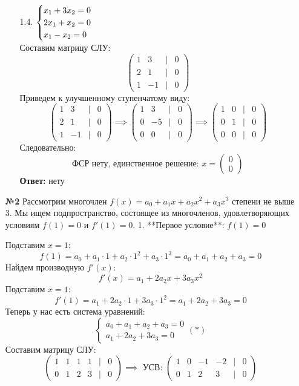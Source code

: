 \documentclass[a4paper]{article}
\newcommand{\mat}[1]{\begin{pmatrix} #1 \end{pmatrix}}
\newcommand{\case}[1]{\begin{cases} #1 \end{cases}}
\begin{document}
\begin{enumerate}
\begin{enumerate}
        \item[1.4.]$
        \case{
        x_{1}+3 x_{2}  =0 \\
        2 x_{1}+x_{2} =0  \\
        x_{1}-x_{2}  =0 
        }\\
        $\\
        Составим матрицу СЛУ:
        $$
        \begin{pmatrix}
        1 & 3 & | & 0 \\
        2 & 1 & | &0 \\
        1 & -1 & | &0
        \end{pmatrix}
        $$
        Приведем к улучшенному ступенчатому виду:
        $$
        \begin{pmatrix}
            1 & 3 & | & 0 \\
            2 & 1 & | &0 \\
            1 & -1 & | &0
            \end{pmatrix}\implies \begin{pmatrix}
        1 & 3 & | & 0 \\
        0 & -5 & | & 0 \\
        0 & 0 & | & 0
        \end{pmatrix} \implies\begin{pmatrix}
            1 & 0 & | &0 \\
            0 & 1 & | &0 \\
            0 & 0 & | &0
            \end{pmatrix}
        $$
        Следовательно:
        $$\text{ФСР нету, единственное решение: } x=\mat{0\\0}$$
        \textbf{Ответ: } нету
    \end{enumerate}

    \item[\textbf{№2}]Рассмотрим многочлен $ f(x) = a_0 + a_1 x + a_2 x^2 + a_3 x^3 $ степени не выше 3. Мы ищем подпространство, состоящее из многочленов, удовлетворяющих условиям $ f(1) = 0 $ и $ f'(1) = 0 $.
    1. **Первое условие**: $ f(1) = 0 $

    Подставим $ x = 1 $:
    $$
    f(1) = a_0 + a_1 \cdot 1 + a_2 \cdot 1^2 + a_3 \cdot 1^3 = a_0 + a_1 + a_2 + a_3 = 0
    $$
    Найдем производную $ f'(x) $:
    $$
    f'(x) = a_1 + 2a_2 x + 3a_3 x^2
    $$
    Подставим $ x = 1 $:
    $$
    f'(1) = a_1 + 2a_2 \cdot 1 + 3a_3 \cdot 1^2 = a_1 + 2a_2 + 3a_3 = 0
    $$
    Теперь у нас есть система уравнений:
    $$
    \begin{cases}
    a_0 + a_1 + a_2 + a_3 = 0 \\
    a_1 + 2a_2 + 3a_3 = 0
    \end{cases} (*)
    $$
    Составим матрицу СЛУ:
    $$\mat{1 & 1 & 1 & 1 & | & 0\\
    0& 1 &2 &3 & |&0}\implies \text{ УСВ: } \mat{1 & 0 & -1 & -2 & | & 0 \\
    0 & 1 & 2 & 3 & | & 0}$$


\end{enumerate}
\end{document}

